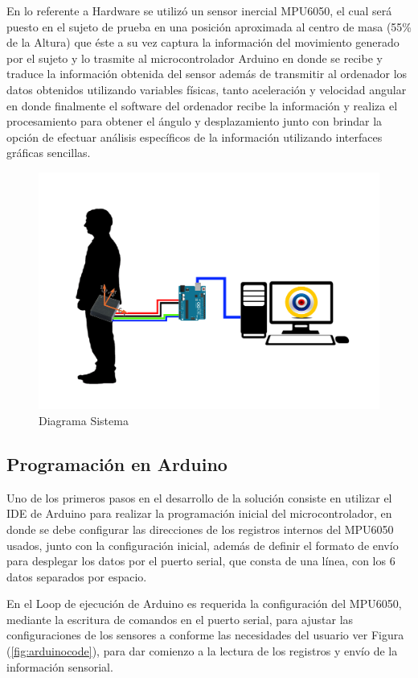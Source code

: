 \documentclass[12pt,a4paper]{article}
\begin{document}
En lo referente a Hardware se utilizó un sensor inercial MPU6050, el cual será puesto en el sujeto de prueba en una posición aproximada al centro de masa (55\% de la Altura) que éste a su vez captura la información del movimiento generado por el sujeto y lo trasmite al microcontrolador Arduino en donde se recibe y traduce la información obtenida del sensor además de transmitir al ordenador los datos obtenidos utilizando variables físicas, tanto aceleración y velocidad angular en donde finalmente el software del ordenador recibe la información y realiza el procesamiento para obtener el ángulo y desplazamiento junto con brindar la opción de efectuar análisis específicos de la información utilizando interfaces gráficas sencillas.


\begin{figure}[H]
	\centering
	\includegraphics[scale=0.15]{images/diagrama_sistema}
	\caption{Diagrama Sistema}
	\label{fig:diagramasistema}
\end{figure}

\subsection{Programación en Arduino}
Uno de los primeros pasos en el desarrollo de la solución consiste en utilizar el IDE de Arduino para realizar la programación inicial del microcontrolador, en donde se debe configurar las direcciones de los registros internos del MPU6050 usados, junto con la configuración inicial, además de definir el formato de envío para desplegar los datos por el puerto serial, que consta de una línea, con los 6 datos separados por espacio.

En el Loop de ejecución de Arduino es requerida la configuración del MPU6050, mediante la escritura de comandos en el puerto serial, para ajustar las configuraciones de los sensores a conforme las necesidades del usuario ver Figura (\ref{fig:arduinocode}), para dar comienzo a la lectura de los registros y envío de la información sensorial.
\end{document}
